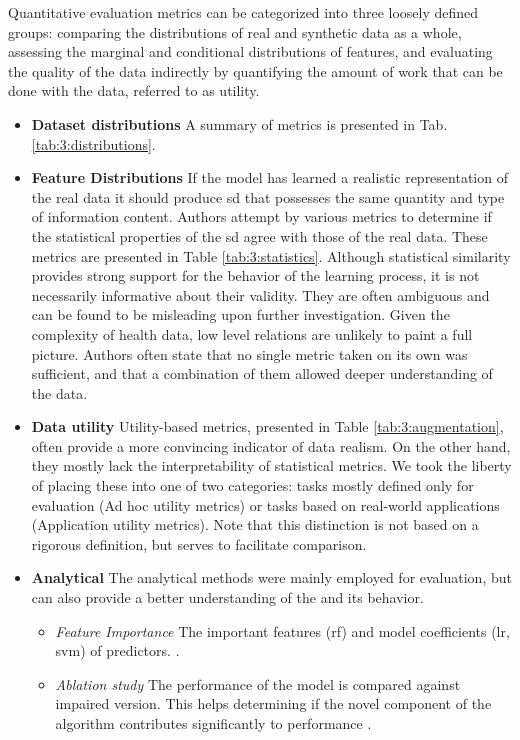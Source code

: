             Quantitative evaluation metrics can be categorized into three loosely defined groups: comparing the distributions of real and synthetic data as a whole, assessing the marginal and conditional distributions of features, and evaluating the quality of the data indirectly by quantifying the amount of work that can be done with the data, referred to as utility.
            
            \begin{itemize}
                \item \textbf{Dataset distributions}
                A summary of metrics is presented in Tab. \ref{tab:3:distributions}.
                \item \textbf{Feature Distributions}
                If the model has learned a realistic representation of the real data it should produce \gls{sd} that possesses the same quantity and type of information content. Authors attempt by various metrics to determine if the statistical properties of the \gls{sd} agree with those of the real data. These metrics are presented in Table \ref{tab:3:statistics}. Although statistical similarity provides strong support for the behavior of the learning process, it is not necessarily informative about their validity. They are often ambiguous and can be found to be misleading upon further investigation. Given the complexity of health data, low level relations are unlikely to paint a full picture. Authors often state that no single metric taken on its own was sufficient, and that a combination of them allowed deeper understanding of the data.
                \item \textbf{Data utility}
                 Utility-based metrics, presented in Table \ref{tab:3:augmentation}, often provide a more convincing indicator of data realism. On the other hand, they mostly lack the interpretability of statistical metrics. We took the liberty of placing these into one of two categories: tasks mostly defined only for evaluation (Ad hoc utility metrics) or tasks based on real-world applications (Application utility metrics). Note that this distinction is not based on a rigorous definition, but serves to facilitate comparison.
                \item \textbf{Analytical} The analytical methods were mainly employed for evaluation, but can also provide a better understanding of the and its behavior.
                \begin{itemize}
                    \item \textsl{Feature Importance} The important features (\gls{rf}) and model coefficients (\gls{lr}, \gls{svm}) of predictors. \cite{esteban2017real,Xu2019-ay,Yoon2020-anon,chin2019generation, Beaulieu-Jones2019-ct}.
                    \item \textsl{Ablation study}  The performance of the model is compared against impaired version. This helps determining if the novel component of the algorithm contributes significantly to performance \cite{cui2019conan, Che_2017, mcdermott2018semi, Yoon2018-radial, chincheong2020generation}.
                \end{itemize}
            \end{itemize}
            

